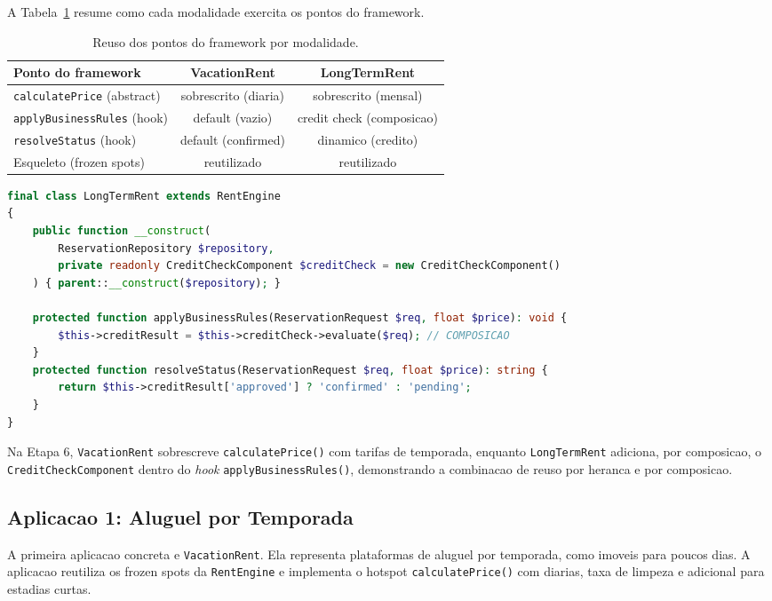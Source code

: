 \documentclass[12pt,a4paper]{article}
\begin{document}
A Tabela~\ref{tab:reuso} resume como cada modalidade exercita os pontos do framework.

\begin{table}[h]
    \centering
    \begin{tabular}{l c c}
        \toprule
        \textbf{Ponto do framework} & \textbf{VacationRent} & \textbf{LongTermRent} \\
        \midrule
        \texttt{calculatePrice} (abstract) & sobrescrito (diaria) & sobrescrito (mensal) \\
        \texttt{applyBusinessRules} (hook)  & default (vazio)      & credit check (composicao) \\
        \texttt{resolveStatus} (hook)       & default (confirmed)  & dinamico (credito) \\
        Esqueleto (frozen spots)            & reutilizado          & reutilizado \\
        \bottomrule
    \end{tabular}
    \caption{Reuso dos pontos do framework por modalidade.}
    \label{tab:reuso}
\end{table}

\begin{lstlisting}[language=PHP,caption={Reuso por composicao: credit check no hook do LongTermRent.},label={lst:longterm}]
final class LongTermRent extends RentEngine
{
    public function __construct(
        ReservationRepository $repository,
        private readonly CreditCheckComponent $creditCheck = new CreditCheckComponent()
    ) { parent::__construct($repository); }

    protected function applyBusinessRules(ReservationRequest $req, float $price): void {
        $this->creditResult = $this->creditCheck->evaluate($req); // COMPOSICAO
    }
    protected function resolveStatus(ReservationRequest $req, float $price): string {
        return $this->creditResult['approved'] ? 'confirmed' : 'pending';
    }
}
\end{lstlisting}

Na Etapa 6, \texttt{VacationRent} sobrescreve \texttt{calculatePrice()} com tarifas de
temporada, enquanto \texttt{LongTermRent} adiciona, por composicao, o
\texttt{CreditCheckComponent} dentro do \textit{hook} \texttt{applyBusinessRules()},
demonstrando a combinacao de reuso por heranca e por composicao.

\subsection{Aplicacao 1: Aluguel por Temporada}
A primeira aplicacao concreta e \texttt{VacationRent}. Ela representa plataformas de
aluguel por temporada, como imoveis para poucos dias. A aplicacao reutiliza os frozen
spots da \texttt{RentEngine} e implementa o hotspot \texttt{calculatePrice()} com
diarias, taxa de limpeza e adicional para estadias curtas.
\end{document}
